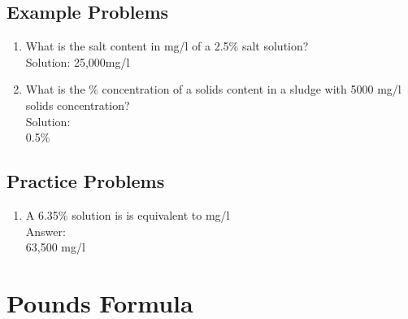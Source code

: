 \documentclass{article}
\begin{document}
 
\subsection{Example Problems} 
\begin{enumerate}
\item What is the salt content in mg/l of a 2.5\% salt solution?\\
Solution:
25,000mg/l
\item What is the \% concentration of a solids content in a sludge with 5000 mg/l solids concentration?\\
Solution:\\
0.5\%\\
\end{enumerate}
\subsection{Practice Problems} 

\begin{enumerate}
\item A 6.35\% solution is is equivalent to {\underline{\hspace{1cm}}} mg/l\\
Answer:\\
63,500 mg/l\\
\end{enumerate}
\section{Pounds Formula}
\end{document}
